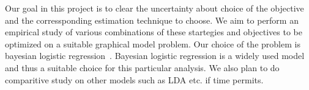 Our goal in this project is to clear the uncertainty about choice of the
objective and the corressponding estimation technique to choose. We aim to
perform an empirical study of various combinations of these startegies and
objectives to be optimized on a suitable graphical model problem. Our choice
of the problem is bayesian logistic regression~\cite{Xu:2008:BLR}. Bayesian
logistic regression is a widely used model and thus a suitable choice for this
particular analysis. We also plan to do comparitive study on other models such
as LDA etc. if time permits.

